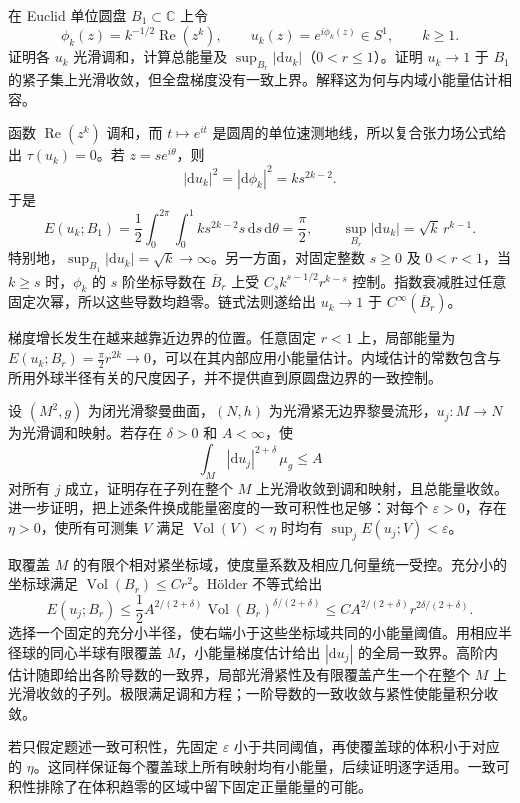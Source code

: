 \begin{exercise}\label{g3:ex:harmonic-map-boundary-layer}
	在 Euclid 单位圆盘 \(B_1\subset\mathbb C\) 上令
	\[
		\phi_k(z)=k^{-1/2}\operatorname{Re}(z^k),\qquad
		u_k(z)=e^{i\phi_k(z)}\in S^1,\qquad k\ge1.
	\]
	证明各 \(u_k\) 光滑调和，计算总能量及 \(\sup_{B_r}|\mathrm du_k|\)（\(0<r\le1\)）。证明 \(u_k\to1\) 于 \(B_1\) 的紧子集上光滑收敛，但全盘梯度没有一致上界。解释这为何与内域小能量估计相容。
\end{exercise}
\begin{solution}
	函数 \(\operatorname{Re}(z^k)\) 调和，而 \(t\mapsto e^{it}\) 是圆周的单位速测地线，所以复合张力场公式给出 \(\tau(u_k)=0\)。若 \(z=se^{i\theta}\)，则
	\[
		|\mathrm du_k|^2=|\mathrm d\phi_k|^2=ks^{2k-2}.
	\]
	于是
	\[
		E(u_k;B_1)=\frac12\int_0^{2\pi}\int_0^1ks^{2k-2}s\,\mathrm ds\,\mathrm d\theta
		=\frac\pi2,
		\qquad
		\sup_{B_r}|\mathrm du_k|=\sqrt{k}\,r^{k-1}.
	\]
	特别地，\(\sup_{B_1}|\mathrm du_k|=\sqrt{k}\to\infty\)。另一方面，对固定整数 \(s\ge0\) 及 \(0<r<1\)，当 \(k\ge s\) 时，\(\phi_k\) 的 \(s\) 阶坐标导数在 \(\overline B_r\) 上受 \(C_s k^{s-1/2}r^{k-s}\) 控制。指数衰减胜过任意固定次幂，所以这些导数均趋零。链式法则遂给出 \(u_k\to1\) 于 \(C^\infty(\overline B_r)\)。

	梯度增长发生在越来越靠近边界的位置。任意固定 \(r<1\) 上，局部能量为 \(E(u_k;B_r)=\frac\pi2r^{2k}\to0\)，可以在其内部应用小能量估计。内域估计的常数包含与所用外球半径有关的尺度因子，并不提供直到原圆盘边界的一致控制。
\end{solution}

\begin{exercise}\label{g3:ex:harmonic-map-no-concentration-lp}
	设 \((M^2,g)\) 为闭光滑黎曼曲面，\((N,h)\) 为光滑紧无边界黎曼流形，\(u_j:M\to N\) 为光滑调和映射。若存在 \(\delta>0\) 和 \(A<\infty\)，使
	\[
		\int_M|\mathrm du_j|^{2+\delta}\,\mu_g\le A
	\]
	对所有 \(j\) 成立，证明存在子列在整个 \(M\) 上光滑收敛到调和映射，且总能量收敛。进一步证明，把上述条件换成能量密度的一致可积性也足够：对每个 \(\varepsilon>0\)，存在 \(\eta>0\)，使所有可测集 \(V\) 满足 \(\operatorname{Vol}(V)<\eta\) 时均有 \(\sup_j E(u_j;V)<\varepsilon\)。
\end{exercise}
\begin{solution}
	取覆盖 \(M\) 的有限个相对紧坐标域，使度量系数及相应几何量统一受控。充分小的坐标球满足 \(\operatorname{Vol}(B_r)\le Cr^2\)。Hölder 不等式给出
	\[
		E(u_j;B_r)
		\le\frac12 A^{2/(2+\delta)}
		\operatorname{Vol}(B_r)^{\delta/(2+\delta)}
		\le C A^{2/(2+\delta)}r^{2\delta/(2+\delta)}.
	\]
	选择一个固定的充分小半径，使右端小于这些坐标域共同的小能量阈值。用相应半径球的同心半球有限覆盖 \(M\)，小能量梯度估计给出 \(|\mathrm du_j|\) 的全局一致界。高阶内估计随即给出各阶导数的一致界，局部光滑紧性及有限覆盖产生一个在整个 \(M\) 上光滑收敛的子列。极限满足调和方程；一阶导数的一致收敛与紧性使能量积分收敛。

	若只假定题述一致可积性，先固定 \(\varepsilon\) 小于共同阈值，再使覆盖球的体积小于对应的 \(\eta\)。这同样保证每个覆盖球上所有映射均有小能量，后续证明逐字适用。一致可积性排除了在体积趋零的区域中留下固定正量能量的可能。
\end{solution}

